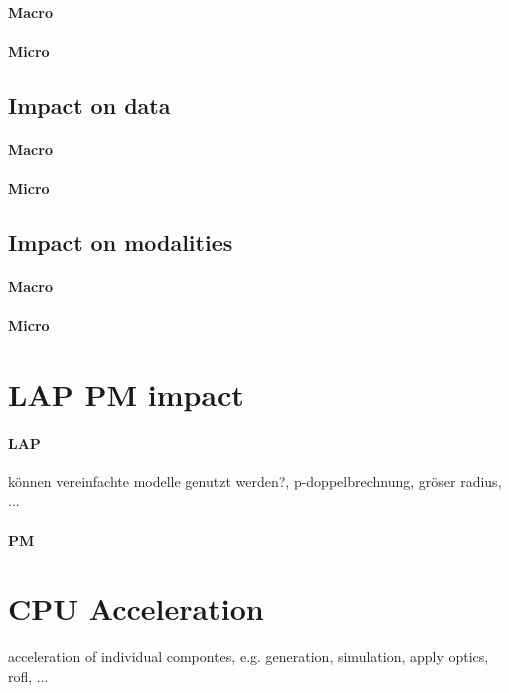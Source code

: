 \paragraph{Macro}
\paragraph{Micro}
% 
\subsection{Impact on data}
%
\begin{figure}[!tb]
\centering
{}
\caption{}
\label{fig:foo_p_zoom}
\end{figure}
% 
\begin{figure}[!tb]
\centering
{}
\caption{}
\label{fig:foo_r}
\end{figure}
% 
\begin{figure}[!tb]
\centering
{}
\caption{}
\label{fig:foo_r_zoom}
\end{figure}
% 
\begin{figure}[!tb]
\centering
{}
\caption{}
\label{fig:foo_p_noise}
\end{figure}
% 
\begin{figure}[!tb]
\centering
{}
\caption{}
\label{fig:foo_r_noise}
\end{figure}
% 
\paragraph{Macro}
\paragraph{Micro}
% 
\subsection{Impact on modalities}
\paragraph{Macro}
\paragraph{Micro}
% 
\section{LAP PM impact}
\paragraph{LAP}
können vereinfachte modelle genutzt werden?, p-doppelbrechnung, gröser radius, ...
\paragraph{PM}
% 
\section{CPU Acceleration}
% 
acceleration of individual compontes, e.g. generation, simulation, apply optics, rofl, ...
